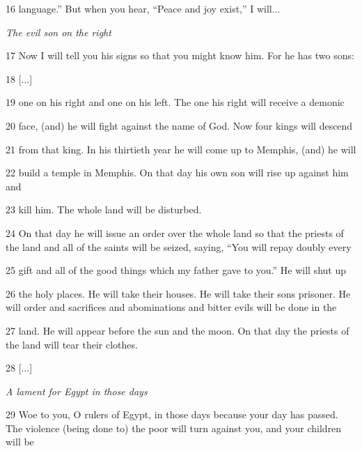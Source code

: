\par 16 language.” But when you hear, “Peace and joy exist,” I will...

\par \textit{The evil son on the right}

\par 17 Now I will tell you his signs so that you might know him. For he has two sons:

\par 18 [...]

\par 19 one on his right and one on his left. The one his right will receive a demonic

\par 20 face, (and) he will fight against the name of God. Now four kings will descend

\par 21 from that king. In his thirtieth year he will come up to Memphis, (and) he will

\par 22 build a temple in Memphis. On that day his own son will rise up against him and

\par 23 kill him. The whole land will be disturbed.

\par 24 On that day he will issue an order over the whole land so that the priests of the land and all of the saints will be seized, saying, “You will repay doubly every

\par 25 gift and all of the good things which my father gave to you.” He will shut up

\par 26 the holy places. He will take their houses. He will take their sons prisoner. He will order and sacrifices and abominations and bitter evils will be done in the

\par 27 land. He will appear before the sun and the moon. On that day the priests of the land will tear their clothes.

\par 28 [...]

\par \textit{A lament for Egypt in those days}

\par 29 Woe to you, O rulers of Egypt, in those days because your day has passed. The violence (being done to) the poor will turn against you, and your children will be

